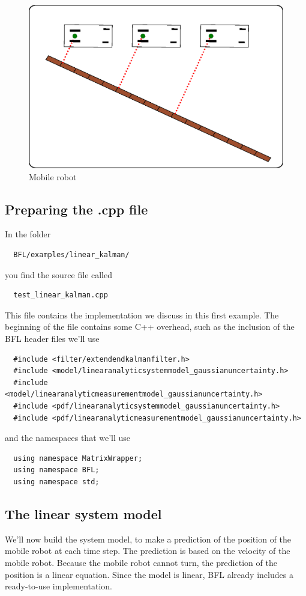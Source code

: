 \documentclass[a4paper,10pt]{report}
\begin{document}
\begin{figure}
\center
\includegraphics[width=12cm]{mobile_robot_simple.eps}
\caption{Mobile robot}
\label{fig: mobile_robot}
\end{figure}




\subsection{Preparing the .cpp file}

In the folder 
\begin{verbatim}
  BFL/examples/linear_kalman/
\end{verbatim}
you find the source file called 
\begin{verbatim}
  test_linear_kalman.cpp
\end{verbatim}
This file contains the implementation we discuss in this first
example. The beginning of the file contains some C++ overhead, such as
the inclusion of the BFL header files we'll use
\begin{verbatim}
  #include <filter/extendendkalmanfilter.h>
  #include <model/linearanalyticsystemmodel_gaussianuncertainty.h>
  #include <model/linearanalyticmeasurementmodel_gaussianuncertainty.h>
  #include <pdf/linearanalyticsystemmodel_gaussianuncertainty.h>
  #include <pdf/linearanalyticmeasurementmodel_gaussianuncertainty.h>
\end{verbatim}
and the namespaces that we'll use
\begin{verbatim}
  using namespace MatrixWrapper;
  using namespace BFL;
  using namespace std;
\end{verbatim}


\subsection{The linear system model}
We'll now build the system model, to make a prediction of the position
of the mobile robot at each time step. The prediction is based on the
velocity of the mobile robot. Because the mobile robot cannot turn,
the prediction of the position is a linear equation. Since the model
is linear, BFL already includes a ready-to-use implementation.
\end{document}
